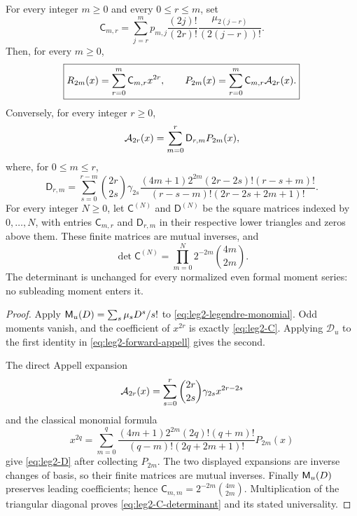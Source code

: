 \begin{theorem}
\label{thm:leg2-appell-transforms}
For every integer $m\ge0$ and every $0\le r\le m$, set
\begin{equation}
 \mathsf C_{m,r}=
 \sum_{j=r}^{m}p_{m,j}
 \frac{(2j)!}{(2r)!}
 \frac{\mu_{2(j-r)}}{(2(j-r))!}.
 \label{eq:leg2-C}
\end{equation}
Then, for every $m\ge0$,
\begin{equation}
 \boxed{R_{2m}(x)=\sum_{r=0}^{m}\mathsf C_{m,r}x^{2r},
 \qquad
 P_{2m}(x)=\sum_{r=0}^{m}\mathsf C_{m,r}\mathcal A_{2r}(x).}
 \label{eq:leg2-forward-appell}
\end{equation}
Conversely, for every integer $r\ge0$,
\begin{equation}
 \mathcal A_{2r}(x)=\sum_{m=0}^{r}\mathsf D_{r,m}P_{2m}(x),
 \label{eq:leg2-inverse-appell}
\end{equation}
where, for $0\le m\le r$,
\begin{equation}
 \boxed{\mathsf D_{r,m}=
 \sum_{s=0}^{r-m}\binom{2r}{2s}\gamma_{2s}
 \frac{(4m+1)2^{2m}(2r-2s)!(r-s+m)!}
 {(r-s-m)!(2r-2s+2m+1)!}.}
 \label{eq:leg2-D}
\end{equation}
For every integer $N\ge0$, let $\mathsf C^{(N)}$ and $\mathsf D^{(N)}$ be
the square matrices indexed by $0,\ldots,N$, with entries
$\mathsf C_{m,r}$ and $\mathsf D_{r,m}$ in their respective lower triangles
and zeros above them.  These finite matrices are mutual inverses, and
\begin{equation}
 \boxed{\det\mathsf C^{(N)}
 =\prod_{m=0}^{N}2^{-2m}\binom{4m}{2m}.}
 \label{eq:leg2-C-determinant}
\end{equation}
The determinant is unchanged for every normalized even formal moment series:
no subleading moment enters it.
\end{theorem}

\begin{proof}
Apply $\mathsf M_u(D)=\sum_s\mu_sD^s/s!$ to
\eqref{eq:leg2-legendre-monomial}.  Odd moments vanish, and the coefficient of
$x^{2r}$ is exactly \eqref{eq:leg2-C}.  Applying $\mathscr D_u$ to the first
identity in \eqref{eq:leg2-forward-appell} gives the second.

The direct Appell expansion
\[
 \mathcal A_{2r}(x)=\sum_{s=0}^{r}\binom{2r}{2s}\gamma_{2s}x^{2r-2s}
\]
and the classical monomial formula
\[
 x^{2q}=\sum_{m=0}^{q}
 \frac{(4m+1)2^{2m}(2q)!(q+m)!}
 {(q-m)!(2q+2m+1)!}P_{2m}(x)
\]
give \eqref{eq:leg2-D} after collecting $P_{2m}$.  The two displayed
expansions are inverse changes of basis, so their finite matrices are mutual
inverses.  Finally $\mathsf M_u(D)$ preserves leading coefficients; hence
$\mathsf C_{m,m}=2^{-2m}\binom{4m}{2m}$.  Multiplication of the triangular
diagonal proves \eqref{eq:leg2-C-determinant} and its stated universality.
\end{proof}

